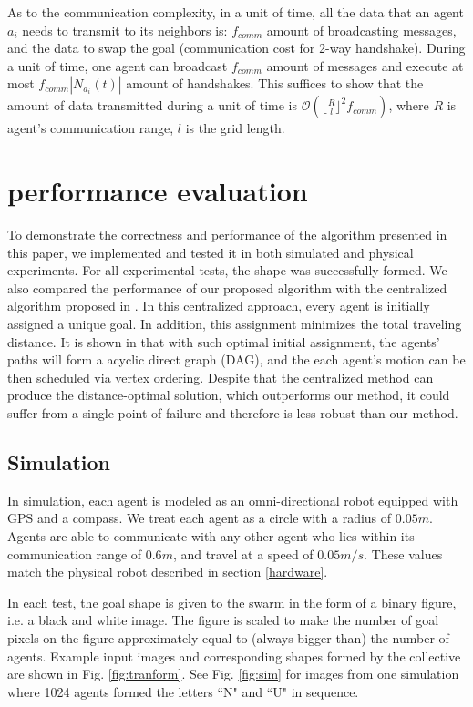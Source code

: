 \documentclass[journal]{IEEEtran}
\begin{document}
As to the communication complexity, in a unit of time, all the data that an agent $a_i$ needs to transmit to its neighbors is: $f_{comm}$ amount of broadcasting messages, and the data to swap the goal (communication cost for 2-way handshake). During a unit of time, one agent can broadcast $f_{comm}$ amount of messages and execute at most $f_{comm}|N_{a_i}(t)|$ amount of handshakes. This suffices to show that the amount of data transmitted during a unit of time is $\mathcal{O}(\lfloor{\frac{R}{l}}\rfloor^2 f_{comm})$, where $R$ is agent's communication range, $l$ is the grid length. 

\section{performance evaluation}
To demonstrate the correctness and performance of the algorithm presented in this paper, we implemented and tested it in both simulated and physical experiments. For all experimental tests, the shape was successfully formed.  We also compared the performance of our proposed algorithm with the centralized algorithm proposed in \cite{centralized}. In this centralized approach, every agent is initially assigned a unique goal.  In addition, this assignment minimizes the total traveling distance. It is shown in \cite{centralized} that with such optimal initial assignment, the agents' paths will form a acyclic direct graph (DAG), and the each agent's motion can be then scheduled via vertex ordering. Despite that the centralized method can produce the distance-optimal solution, which outperforms our method, it could suffer from a single-point of failure and therefore is less robust than our method.

\subsection{Simulation}

In simulation, each agent is modeled as an omni-directional robot equipped with GPS and a compass. We treat each agent as a circle with a radius of $0.05m$.  Agents are able to communicate with any other agent who lies within its communication range of $0.6m$, and travel at a speed of $0.05m/s$. These values match the physical robot described in section \ref{hardware}. 

In each test, the goal shape is given to the swarm in the form of a binary figure, i.e. a black and white image. The figure is scaled to make the number of goal pixels on the figure approximately equal to (always bigger than) the number of agents.  Example input images and corresponding shapes formed by the collective are shown in Fig. \ref{fig:tranform}. See Fig. \ref{fig:sim} for images from one simulation where 1024 agents formed the letters ``N" and ``U" in sequence.
\end{document}
